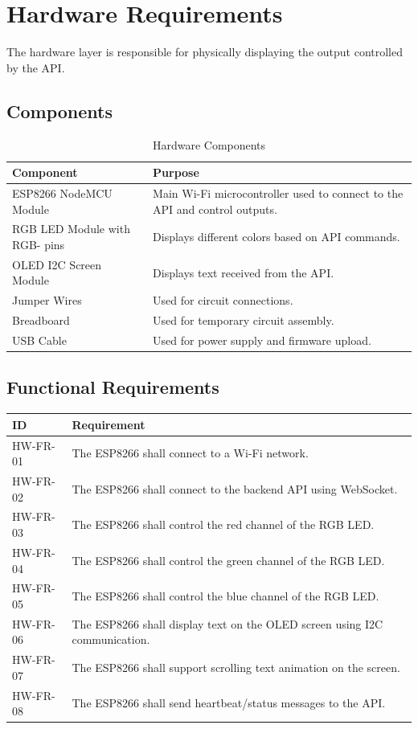 \documentclass[12pt,a4paper]{report}
\begin{document}
\section{Hardware Requirements}

The hardware layer is responsible for physically displaying the output controlled by the API.

\subsection{Components}

\begin{table}[H]
\centering
\renewcommand{\arraystretch}{1.4}
\begin{tabular}{p{5cm} p{8cm}}
\toprule
\textbf{Component} & \textbf{Purpose} \\
\midrule
ESP8266 NodeMCU Module & Main Wi-Fi microcontroller used to connect to the API and control outputs. \\
RGB LED Module with RGB- pins & Displays different colors based on API commands. \\
OLED I2C Screen Module & Displays text received from the API. \\
Jumper Wires & Used for circuit connections. \\
Breadboard & Used for temporary circuit assembly. \\
USB Cable & Used for power supply and firmware upload. \\
\bottomrule
\end{tabular}
\caption{Hardware Components}
\end{table}

\subsection{Functional Requirements}

\begin{longtable}{p{2.5cm} p{11cm}}
\toprule
\textbf{ID} & \textbf{Requirement} \\
\midrule
HW-FR-01 & The ESP8266 shall connect to a Wi-Fi network. \\
HW-FR-02 & The ESP8266 shall connect to the backend API using WebSocket. \\
HW-FR-03 & The ESP8266 shall control the red channel of the RGB LED. \\
HW-FR-04 & The ESP8266 shall control the green channel of the RGB LED. \\
HW-FR-05 & The ESP8266 shall control the blue channel of the RGB LED. \\
HW-FR-06 & The ESP8266 shall display text on the OLED screen using I2C communication. \\
HW-FR-07 & The ESP8266 shall support scrolling text animation on the screen. \\
HW-FR-08 & The ESP8266 shall send heartbeat/status messages to the API. \\
\bottomrule
\end{longtable}
\end{document}
